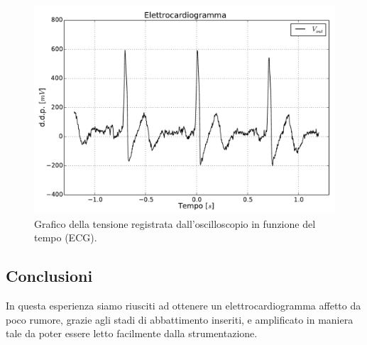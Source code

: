 \begin{figure}[htpc]
\centering
\includegraphics[width=.7\textwidth]{../E07/latex/g4.pdf}
\caption{Grafico della tensione registrata dall'oscilloscopio in funzione del tempo (ECG).}
\label{fig7:ecg_output}
\end{figure}

\subsection*{Conclusioni}
In questa esperienza siamo riusciti ad ottenere un elettrocardiogramma affetto da poco rumore, grazie agli stadi di abbattimento inseriti, e amplificato in maniera tale da poter essere letto facilmente dalla strumentazione.

